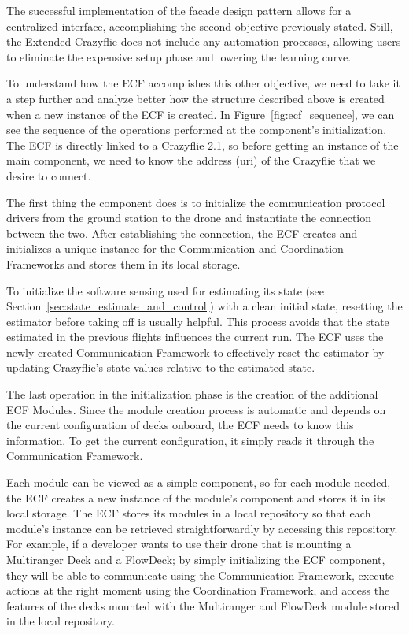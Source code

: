 The successful implementation of the facade design pattern allows for a centralized interface, accomplishing the second objective previously stated.
Still, the Extended Crazyflie does not include any automation processes, allowing users to eliminate the expensive setup phase and lowering the learning curve.

To understand how the ECF accomplishes this other objective, we need to take it a step further and analyze better how the structure described above is created when a new instance of the ECF is created.
In Figure~\ref{fig:ecf_sequence}, we can see the sequence of the operations performed at the component's initialization.
The ECF is directly linked to a Crazyflie 2.1, so before getting an instance of the main component, we need to know the address (uri) of the Crazyflie that we desire to connect.

The first thing the component does is to initialize the communication protocol drivers from the ground station to the drone and instantiate the connection between the two.
After establishing the connection, the ECF creates and initializes a unique instance for the Communication and Coordination Frameworks and stores them in its local storage.

To initialize the software sensing used for estimating its state (see Section~\ref{sec:state_estimate_and_control}) with a clean initial state, resetting the estimator before taking off is usually helpful. 
This process avoids that the state estimated in the previous flights influences the current run. 
The ECF uses the newly created Communication Framework to effectively reset the estimator by updating Crazyflie's state values relative to the estimated state.

The last operation in the initialization phase is the creation of the additional ECF Modules.
Since the module creation process is automatic and depends on the current configuration of decks onboard, the ECF needs to know this information.
To get the current configuration, it simply reads it through the Communication Framework.

Each module can be viewed as a simple component, so for each module needed, the ECF creates a new instance of the module's component and stores it in its local storage. 
The ECF stores its modules in a local repository so that each module's instance can be retrieved straightforwardly by accessing this repository.
For example, if a developer wants to use their drone that is mounting a Multiranger Deck and a FlowDeck; 
by simply initializing the ECF component, they will be able to communicate using the Communication Framework, execute actions at the right moment using the Coordination Framework, and access the features of the decks mounted with the Multiranger and FlowDeck module stored in the local repository.

